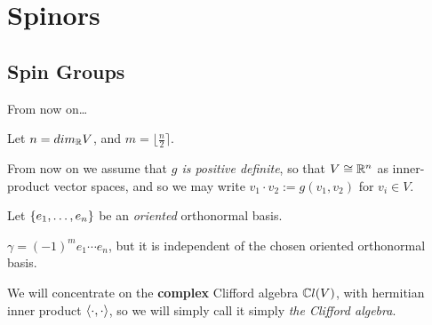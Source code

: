 \section{Spinors}

\subsection{Spin Groups}

\begin{frame}{From now on\dots} %

    Let $n = dim_\mathbb R V$, and $m = \lfloor \frac{n}{2} \rceil$.

    From now on we assume that \emph{$g$ is positive definite}, so that $V \cong \mathbb R^n$ as inner-product vector spaces, and so we may write $v_1 \cdot v_2 := g(v_1, v_2)$ for $v_i \in V$. %
    
    Let $\{e_1, \dots, e_n\}$ be an \emph{oriented} orthonormal basis.
    
    $\gamma = (-1)^m e_1 \cdots e_n$, but it is independent of the chosen oriented orthonormal basis. %

    We will concentrate on the \textbf{complex} Clifford algebra $\mathbb C l(V)$, with hermitian inner product $\langle \cdot , \cdot \rangle$, so we will simply call it simply \emph{the Clifford algebra}.%
    
\end{frame}


